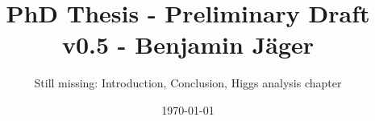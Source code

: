

\endofdump


% 

\newif\ifIMAGES
\IMAGEStrue




\author{Still missing: Introduction, Conclusion, Higgs analysis chapter}
\date{\today}
\title{PhD Thesis - Preliminary Draft v0.5 - Benjamin Jäger}




\maketitle





\tableofcontents


\newcommand{\chapterdir}{chapters}
%







